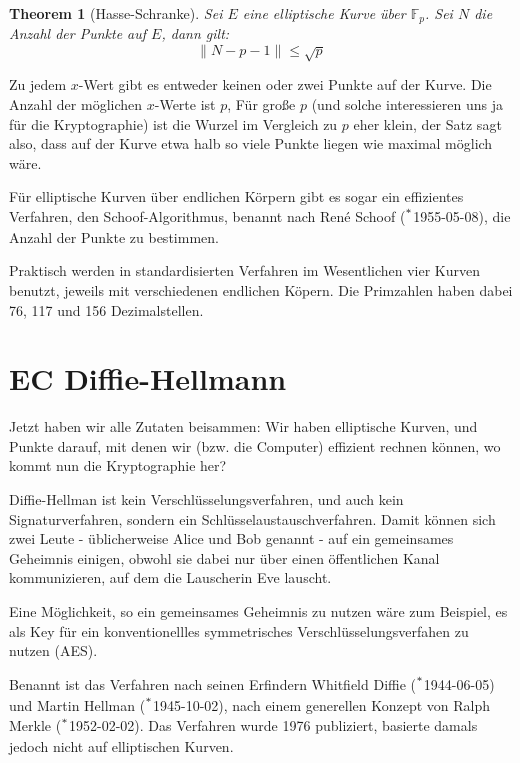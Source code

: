 \documentclass{article}
\newcommand{\F}{\mathbb{F}}
\newcounter{thm}
\newtheorem{theorem}[thm]{Theorem}
\begin{document}
\begin{theorem}[Hasse-Schranke]
    Sei $E$ eine elliptische Kurve über $\F_p$. Sei $N$ die Anzahl der Punkte
    auf $E$, dann gilt:
    \begin{equation}
      \| N - p - 1 \| \le \sqrt{p}
    \end{equation}
\end{theorem}

Zu jedem $x$-Wert gibt es entweder keinen oder zwei Punkte auf der Kurve. Die Anzahl
der möglichen $x$-Werte ist $p$, Für große $p$ (und solche interessieren uns
ja für die Kryptographie) ist die Wurzel im Vergleich zu $p$ eher klein,
der Satz sagt also, dass auf der Kurve etwa halb so viele Punkte liegen wie
maximal möglich wäre.

Für elliptische Kurven über endlichen Körpern gibt es sogar ein effizientes
Verfahren, den Schoof-Algorithmus, benannt nach René Schoof ($\strut^*$1955-05-08),
die Anzahl der Punkte zu bestimmen.

Praktisch werden in standardisierten Verfahren im Wesentlichen vier Kurven
benutzt, jeweils mit verschiedenen endlichen Köpern. Die Primzahlen haben
dabei 76, 117 und 156 Dezimalstellen.



\section{EC Diffie-Hellmann}

Jetzt haben wir alle Zutaten beisammen: Wir haben elliptische Kurven, und
Punkte darauf, mit denen wir (bzw. die Computer) effizient rechnen können, wo
kommt nun die Kryptographie her?

Diffie-Hellman ist kein Verschlüsselungsverfahren, und auch kein
Signaturverfahren, sondern ein Schlüsselaustauschverfahren.  Damit können sich
zwei Leute - üblicherweise Alice und Bob genannt - auf ein gemeinsames
Geheimnis einigen, obwohl sie dabei nur über einen öffentlichen Kanal kommunizieren,
auf dem die Lauscherin Eve lauscht.

Eine Möglichkeit, so ein gemeinsames Geheimnis zu nutzen wäre zum
Beispiel, es als Key für ein konventionellles symmetrisches
Verschlüsselungsverfahen zu nutzen (AES).

Benannt ist das Verfahren nach seinen Erfindern Whitfield Diffie
($\strut^*$1944-06-05) und Martin
Hellman ($\strut^*$1945-10-02), nach einem generellen Konzept von Ralph
Merkle ($\strut^*$1952-02-02). Das Verfahren wurde 1976 publiziert, basierte
damals jedoch nicht auf elliptischen Kurven.
\end{document}
